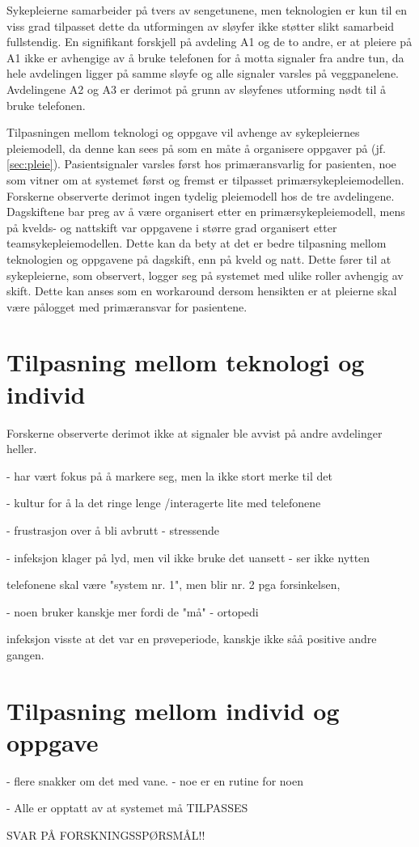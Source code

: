 \noindent
Sykepleierne samarbeider på tvers av sengetunene, men teknologien er kun til en viss grad tilpasset dette da utformingen av sløyfer ikke støtter slikt samarbeid fullstendig. En signifikant forskjell på avdeling A1 og de to andre, er at pleiere på A1 ikke er avhengige av å bruke telefonen for å motta signaler fra andre tun, da hele avdelingen ligger på samme sløyfe og alle signaler varsles på veggpanelene. Avdelingene A2 og A3 er derimot på grunn av sløyfenes utforming nødt til å bruke telefonen.

\noindent	
Tilpasningen mellom teknologi og oppgave vil avhenge av sykepleiernes pleiemodell, da denne kan sees på som en måte å organisere oppgaver på (jf. \ref{sec:pleie}). Pasientsignaler varsles først hos primæransvarlig for pasienten, noe som vitner om at systemet først og fremst er tilpasset primærsykepleiemodellen. Forskerne observerte derimot ingen tydelig pleiemodell hos de tre avdelingene. Dagskiftene bar preg av å være organisert etter en primærsykepleiemodell, mens på kvelds- og nattskift var oppgavene i større grad organisert etter teamsykepleiemodellen. Dette kan da bety at det er bedre tilpasning mellom teknologien og oppgavene på dagskift, enn på kveld og natt. Dette fører til at sykepleierne, som observert, logger seg på systemet med ulike roller avhengig av skift. Dette kan anses som en workaround dersom hensikten er at pleierne skal være pålogget med primæransvar for pasientene.

		
\section{Tilpasning mellom teknologi og individ}
Forskerne observerte derimot ikke at signaler ble avvist på andre avdelinger heller.

- har vært fokus på å markere seg, men la ikke stort merke til det

- kultur for å la det ringe lenge /interagerte lite med telefonene

- frustrasjon over å bli avbrutt
	- stressende

- infeksjon klager på lyd, men vil ikke bruke det uansett
	- ser ikke nytten
	
	 telefonene skal være "system nr. 1", men blir nr. 2 pga forsinkelsen,
	 
- noen bruker kanskje mer fordi de "må" - ortopedi	 
	 
	 infeksjon visste at det var en prøveperiode, kanskje ikke såå positive andre gangen.

\section{Tilpasning mellom individ og oppgave}

- flere snakker om det med vane.
 - noe er en rutine for noen



- Alle er opptatt av at systemet må TILPASSES

SVAR PÅ FORSKNINGSSPØRSMÅL!!